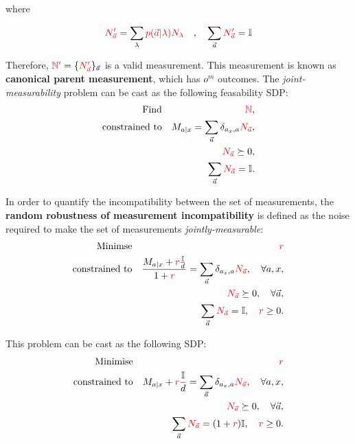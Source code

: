 \documentclass[12pt, letterpaper]{article}
\begin{document}
where

\[
\textcolor{red}{N'_{\vec{a}}} = \sum_\lambda \textcolor{red}{p(\vec{a}|\lambda)N_\lambda}\quad , \quad \sum_{\vec{a}}\textcolor{red}{N'_{\vec{a}}} = \mathbb{I}
\]

Therefore, $\textcolor{red}{\mathbb{N}'} = \{ \textcolor{red}{N'_{\vec{a}}} \}_{\vec{a}}$ is a valid measurement. This measurement is known as \textbf{canonical parent measurement}, which has $o^m$ outcomes. The \textit{joint-measurability} problem can be cast as the following feasability SDP:
\begin{eqnarray*}
    \text{Find} && \textcolor{red}{\mathbb{N}}, \\
    \text{constrained to} && M_{a|x} = \sum_{\vec{a}} \delta_{a_x,a}\textcolor{red}{N_{\vec{a}}}, \\
    && \textcolor{red}{N_{\vec{a}}} \succeq 0, \\
    && \sum_{\vec{a}} \textcolor{red}{N_{\vec{a}}} = \mathbb{I}.
\end{eqnarray*}

In order to quantify the incompatibility between the set of measurements, the \textbf{random robustness of measurement incompatibility} is defined as the noise required to make the set of measurements \textit{jointly-measurable}:
\begin{eqnarray*}
    \text{Minimse} && \textcolor{red}{r} \\
    \text{constrained to} && \frac{M_{a|x} + \textcolor{red}{r}\frac{\mathbb{I}}{d}}{1 + \textcolor{red}{r}} = \sum_{\vec{a}} \delta_{a_x, a} \textcolor{red}{N_{\vec{a}}},\quad \forall a,x,\\
    && \textcolor{red}{N_{\vec{a}}} \succeq 0, \quad \forall\vec{a},\\
    && \sum_{\vec{a}}\textcolor{red}{N_{\vec{a}}} = \mathbb{I}, \quad \textcolor{red}{r} \geq 0.
\end{eqnarray*}

This problem can be cast as the following SDP:
\begin{eqnarray*}
    \text{Minimise} && \textcolor{red}{r} \\
    \text{constrained to} && M_{a|x} + \textcolor{red}{r}\frac{\mathbb{I}}{d} = \sum_{\vec{a}}\delta_{a_x,a}\textcolor{red}{N_{\vec{a}}}, \quad \forall a,x,\\
    && \textcolor{red}{N_{\vec{a}}} \succeq 0, \quad \forall\vec{a}, \\
    && \sum_{\vec{a}} \textcolor{red}{N_{\vec{a}}} = (1 + \textcolor{red}{r})\mathbb{I}, \quad \textcolor{red}{r} \geq 0.
\end{eqnarray*}
\end{document}
